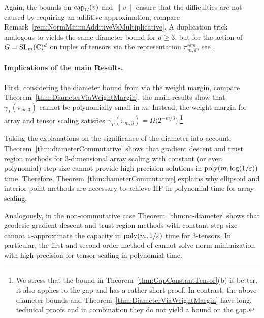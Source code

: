Again, the bounds on $\operatorname{cap}_G(v)$ and $\|v\|$ ensure that the difficulties are not caused by requiring an additive approximation, compare Remark~\ref{rem:NormMinimAdditiveVsMultiplicative}.
A duplication trick analogous to \cite[Corollary~3.7]{WeightMargin} yields the same diameter bound for $d \geq 3$, but for the action of $G = \operatorname{SL}_{m}(\mathbb C)^d$ on tuples of tensors via the representation $\pi_{m,d}^{\oplus m}$, see \cite[Corollary~4.24]{WeightMargin}.



\paragraph{Implications of the main Results.}

First, considering the diameter bound from \cite{GradflowArXiv} via the weight margin, compare Theorem~\ref{thm:DiameterViaWeightMargin}, the main results show that $\gamma_T(\pi_{m,3})$ cannot be polynomially small in $m$. Instead, the weight margin for array and tensor scaling satisfies $\gamma_T(\pi_{m,3}) = \Omega\big( 2^{-m/3} \big)$.\footnote{We stress that the bound in Theorem~\ref{thm:GapConstantTensor}(b) is better, it also applies to the gap and has a rather short proof. In contrast, the above diameter bounds and Theorem~\ref{thm:DiameterViaWeightMargin} have long, technical proofs and in combination they do not yield a bound on the gap.}

Taking the explanations on the significance of the diameter into account,
Theorem~\ref{thm:diameterCommutative} shows that gradient descent and trust region methods for $3$-dimensional array scaling with constant (or even polynomial) step size cannot provide high precision solutions in $\operatorname{poly}(m,\log(1/\varepsilon))$ time.
Therefore, Theorem~\ref{thm:diameterCommutative} explains why ellipsoid and interior point methods are necessary to achieve HP in polynomial time for array scaling.

Analogously, in the non-commutative case Theorem~\ref{thm:nc-diameter} shows that geodesic gradient descent
and trust region methods with constant step size cannot $\varepsilon$-approximate the capacity in $\operatorname{poly}(m, 1/\varepsilon)$ time for $3$-tensors. In particular, the first and second order method of \cite{GradflowArXiv} cannot solve norm minimization with high precision for tensor scaling in polynomial time.

